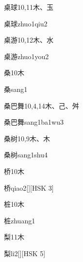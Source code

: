 \begin{entry}{桌球}{10,11}{⽊、⽟}
  \begin{phonetics}{桌球}{zhuo1qiu2}
  \end{phonetics}
\end{entry}

\begin{entry}{桌游}{10,12}{⽊、⽔}
  \begin{phonetics}{桌游}{zhuo1you2}
  \end{phonetics}
\end{entry}

\begin{entry}{桑}{10}{⽊}
  \begin{phonetics}{桑}{sang1}
  \end{phonetics}
\end{entry}

\begin{entry}{桑巴舞}{10,4,14}{⽊、⼰、⾇}
  \begin{phonetics}{桑巴舞}{sang1ba1wu3}
  \end{phonetics}
\end{entry}

\begin{entry}{桑树}{10,9}{⽊、⽊}
  \begin{phonetics}{桑树}{sang1shu4}
  \end{phonetics}
\end{entry}

\begin{entry}{桥}{10}{⽊}
  \begin{phonetics}{桥}{qiao2}[][HSK 3]
  \end{phonetics}
\end{entry}

\begin{entry}{桩}{10}{⽊}
  \begin{phonetics}{桩}{zhuang1}
  \end{phonetics}
\end{entry}

\begin{entry}{梨}{11}{⽊}
  \begin{phonetics}{梨}{li2}[][HSK 5]
  \end{phonetics}
\end{entry}

